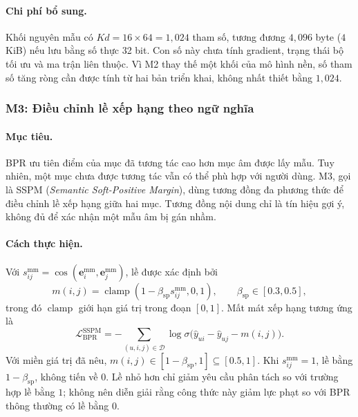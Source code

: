 \paragraph{Chi phí bổ sung.}
Khối nguyên mẫu có $Kd=16\times64=1{,}024$ tham số, tương đương $4{,}096$ byte ($4$ KiB) nếu lưu bằng số thực 32 bit. Con số này chưa tính gradient, trạng thái bộ tối ưu và ma trận liên thuộc. Vì M2 thay thế một khối của mô hình nền, số tham số tăng ròng cần được tính từ hai bản triển khai, không nhất thiết bằng $1{,}024$.

\subsubsection{M3: Điều chỉnh lề xếp hạng theo ngữ nghĩa}

\paragraph{Mục tiêu.}
BPR ưu tiên điểm của mục đã tương tác cao hơn mục âm được lấy mẫu. Tuy nhiên, một mục chưa được tương tác vẫn có thể phù hợp với người dùng. M3, gọi là SSPM (\textit{Semantic Soft-Positive Margin}), dùng tương đồng đa phương thức để điều chỉnh lề xếp hạng giữa hai mục. Tương đồng nội dung chỉ là tín hiệu gợi ý, không đủ để xác nhận một mẫu âm bị gán nhầm.

\paragraph{Cách thực hiện.}
Với $s_{ij}^{\text{mm}}=\cos(\mathbf e_i^{\text{mm}},\mathbf e_j^{\text{mm}})$, lề được xác định bởi
\begin{equation}
m(i,j)=\operatorname{clamp}(1-\beta_{\text{sp}}s_{ij}^{\text{mm}},0,1),
\qquad \beta_{\text{sp}}\in[0.3,0.5],
\label{eq:sspm_margin}
\end{equation}
trong đó $\operatorname{clamp}$ giới hạn giá trị trong đoạn $[0,1]$. Mất mát xếp hạng tương ứng là
\begin{equation}
\mathcal L_{\text{BPR}}^{\text{SSPM}}=-\sum_{(u,i,j)\in\mathcal D}
\log\sigma\bigl(\hat y_{ui}-\hat y_{uj}-m(i,j)\bigr).
\label{eq:sspm_loss}
\end{equation}
Với miền giá trị đã nêu, $m(i,j)\in[1-\beta_{\text{sp}},1]\subseteq[0.5,1]$. Khi $s_{ij}^{\text{mm}}=1$, lề bằng $1-\beta_{\text{sp}}$, không tiến về $0$. Lề nhỏ hơn chỉ giảm yêu cầu phân tách so với trường hợp lề bằng $1$; không nên diễn giải rằng công thức này giảm lực phạt so với BPR thông thường có lề bằng $0$.

